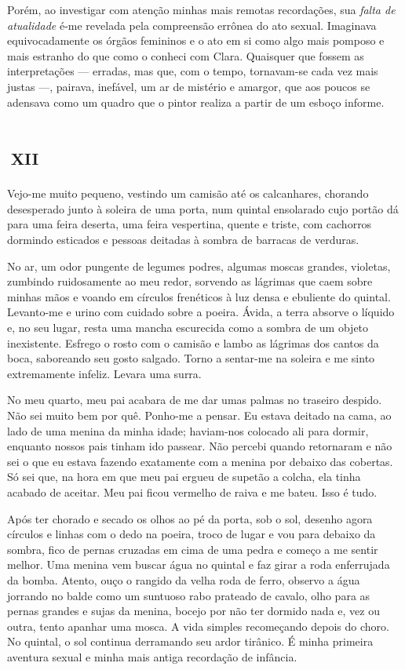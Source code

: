 Porém, ao investigar com atenção minhas mais remotas recordações, sua \textit{falta de atualidade} é-me revelada pela compreensão errônea do ato sexual. Imaginava equivocadamente os órgãos femininos e o ato em si como algo mais pomposo e mais estranho do que como o conheci com Clara. Quaisquer que fossem as interpretações --- erradas, mas que, com o tempo, tornavam-se cada vez mais justas ---, pairava, inefável, um ar de mistério e amargor, que aos poucos se adensava como um quadro que o pintor realiza a partir de um esboço informe.


\chapter*{\small{}\,\Large\centering\textsc{xii}\,\small{}}

Vejo-me muito pequeno, vestindo um camisão até os calcanhares, chorando desesperado junto à soleira de uma porta, num quintal ensolarado cujo portão dá para uma feira deserta, uma feira vespertina, quente e triste, com cachorros dormindo esticados e pessoas deitadas à sombra de barracas de verduras.

No ar, um odor pungente de legumes podres, algumas moscas grandes, violetas, zumbindo ruidosamente ao meu redor, sorvendo as lágrimas que caem sobre minhas mãos e voando em círculos frenéticos à luz densa e ebuliente do quintal. Levanto-me e urino com cuidado sobre a poeira. Ávida, a terra absorve o líquido e, no seu lugar, resta uma mancha escurecida como a sombra de um objeto inexistente. Esfrego o rosto com o camisão e lambo as lágrimas dos cantos da boca, saboreando seu gosto salgado. Torno a sentar-me na soleira e me sinto extremamente infeliz. Levara uma surra.

No meu quarto, meu pai acabara de me dar umas palmas no traseiro despido. Não sei muito bem por quê. Ponho-me a pensar. Eu estava deitado na cama, ao lado de uma menina da minha idade; haviam-nos colocado ali para dormir, enquanto nossos pais tinham ido passear. Não percebi quando retornaram e não sei o que eu estava fazendo exatamente com a menina por debaixo das cobertas. Só sei que, na hora em que meu pai ergueu de supetão a colcha, ela tinha acabado de aceitar. Meu pai ficou vermelho de raiva e me bateu. Isso é tudo.

Após ter chorado e secado os olhos ao pé da porta, sob o sol, desenho agora círculos e linhas com o dedo na poeira, troco de lugar e vou para debaixo da sombra, fico de pernas cruzadas em cima de uma pedra e começo a me sentir melhor. Uma menina vem buscar água no quintal e faz girar a roda enferrujada da bomba. Atento, ouço o rangido da velha roda de ferro, observo a água jorrando no balde como um suntuoso rabo prateado de cavalo, olho para as pernas grandes e sujas da menina, bocejo por não ter dormido nada e, vez ou outra, tento apanhar uma mosca. A vida simples recomeçando depois do choro. No quintal, o sol continua derramando seu ardor tirânico. É minha primeira aventura sexual e minha mais antiga recordação de infância.

